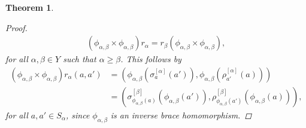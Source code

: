 \documentclass[preprint,1p]{elsarticle}
\newtheorem{theor}{Theorem}[section]
\theoremstyle{definition}               %
\newcommand{\phii}[2]{\phi_{#1,#2}}
\begin{document}
\begin{theor}
\begin{proof}
        \begin{align*}
            \left(\phi_{\alpha,\beta}\times \phi_{\alpha,\beta}\right)r_{\alpha}
		= r_{\beta}\left(\phi_{\alpha, \beta}\times \phi_{\alpha, \beta}\right), 
        \end{align*}
for all $\alpha, \beta\in Y$ such that  $\alpha \geq \beta$. This follows by
\begin{align*}
\left(\phi_{\alpha,\beta}\times \phi_{\alpha,\beta}\right)r_{\alpha}(a, a')&=  \left(\phi_{\alpha,\beta}\left(\sigma^{[\alpha]}_a\left(a'\right)\right), \phi_{\alpha,\beta}\left(\rho^{[\alpha]}_{a'}\left(a\right)\right)\right)\\
 &=\left(\sigma^{[\beta]}_{\phii{\alpha}{\beta}(a)}\left(\phii{\alpha}{\beta}\left(a'\right)\right), \rho^{[\beta]}_{\phii{\alpha}{\beta}\left(a'\right)}\left(\phii{\alpha}{\beta}\left(a\right)\right)\right),
\end{align*}
for all $a, a' \in S_\alpha$, since $\phi_{\alpha,\beta}$ is an inverse brace homomorphism.
    \end{proof}
\end{theor}



\smallskip
\end{document}
